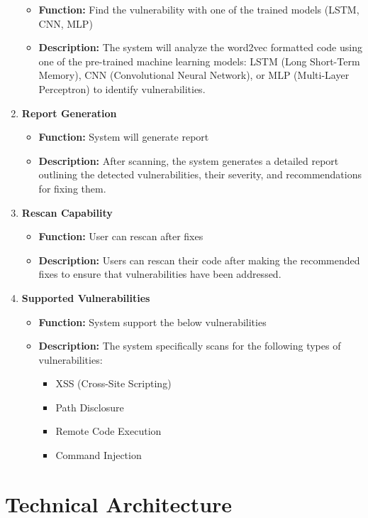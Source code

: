\begin{enumerate}
    \begin{itemize}
        \item \textbf{Function:} Find the vulnerability with one of the trained models (LSTM, CNN, MLP)
        \item \textbf{Description:} The system will analyze the word2vec formatted code using one of the pre-trained machine learning models: LSTM (Long Short-Term Memory), CNN (Convolutional Neural Network), or MLP (Multi-Layer Perceptron) to identify vulnerabilities.
    \end{itemize}
    \item \textbf{Report Generation}
    \begin{itemize}
        \item \textbf{Function:} System will generate report
        \item \textbf{Description:} After scanning, the system generates a detailed report outlining the detected vulnerabilities, their severity, and recommendations for fixing them.
    \end{itemize}
    \item \textbf{Rescan Capability}
    \begin{itemize}
        \item \textbf{Function:} User can rescan after fixes
        \item \textbf{Description:} Users can rescan their code after making the recommended fixes to ensure that vulnerabilities have been addressed.
    \end{itemize}
    \item \textbf{Supported Vulnerabilities}
    \begin{itemize}
        \item \textbf{Function:} System support the below vulnerabilities
        \item \textbf{Description:} The system specifically scans for the following types of vulnerabilities:
        \begin{itemize}
            \item XSS (Cross-Site Scripting)
            \item Path Disclosure
            \item Remote Code Execution
            \item Command Injection
        \end{itemize}
    \end{itemize}
\end{enumerate}

\section*{Technical Architecture}
